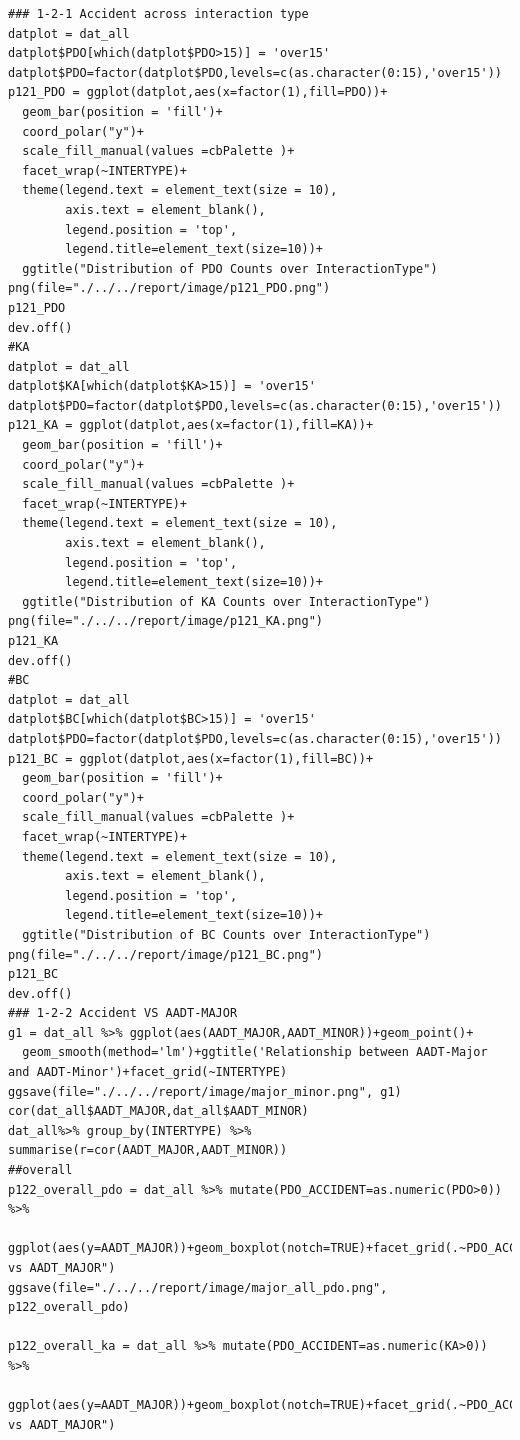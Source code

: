 \documentclass[11pt]{scrartcl} %
\begin{document}
\begin{lstlisting}
### 1-2-1 Accident across interaction type
datplot = dat_all
datplot$PDO[which(datplot$PDO>15)] = 'over15'
datplot$PDO=factor(datplot$PDO,levels=c(as.character(0:15),'over15'))
p121_PDO = ggplot(datplot,aes(x=factor(1),fill=PDO))+
  geom_bar(position = 'fill')+
  coord_polar("y")+
  scale_fill_manual(values =cbPalette )+
  facet_wrap(~INTERTYPE)+
  theme(legend.text = element_text(size = 10),
        axis.text = element_blank(),
        legend.position = 'top',
        legend.title=element_text(size=10))+
  ggtitle("Distribution of PDO Counts over InteractionType")
png(file="./../../report/image/p121_PDO.png")
p121_PDO
dev.off()
#KA
datplot = dat_all
datplot$KA[which(datplot$KA>15)] = 'over15'
datplot$PDO=factor(datplot$PDO,levels=c(as.character(0:15),'over15'))
p121_KA = ggplot(datplot,aes(x=factor(1),fill=KA))+
  geom_bar(position = 'fill')+
  coord_polar("y")+
  scale_fill_manual(values =cbPalette )+
  facet_wrap(~INTERTYPE)+
  theme(legend.text = element_text(size = 10),
        axis.text = element_blank(),
        legend.position = 'top',
        legend.title=element_text(size=10))+
  ggtitle("Distribution of KA Counts over InteractionType")
png(file="./../../report/image/p121_KA.png")
p121_KA
dev.off()
#BC
datplot = dat_all
datplot$BC[which(datplot$BC>15)] = 'over15'
datplot$PDO=factor(datplot$PDO,levels=c(as.character(0:15),'over15'))
p121_BC = ggplot(datplot,aes(x=factor(1),fill=BC))+
  geom_bar(position = 'fill')+
  coord_polar("y")+
  scale_fill_manual(values =cbPalette )+
  facet_wrap(~INTERTYPE)+
  theme(legend.text = element_text(size = 10),
        axis.text = element_blank(),
        legend.position = 'top',
        legend.title=element_text(size=10))+
  ggtitle("Distribution of BC Counts over InteractionType")
png(file="./../../report/image/p121_BC.png")
p121_BC
dev.off()
### 1-2-2 Accident VS AADT-MAJOR
g1 = dat_all %>% ggplot(aes(AADT_MAJOR,AADT_MINOR))+geom_point()+
  geom_smooth(method='lm')+ggtitle('Relationship between AADT-Major and AADT-Minor')+facet_grid(~INTERTYPE)
ggsave(file="./../../report/image/major_minor.png", g1)
cor(dat_all$AADT_MAJOR,dat_all$AADT_MINOR)
dat_all%>% group_by(INTERTYPE) %>% summarise(r=cor(AADT_MAJOR,AADT_MINOR))
##overall
p122_overall_pdo = dat_all %>% mutate(PDO_ACCIDENT=as.numeric(PDO>0)) %>%
  ggplot(aes(y=AADT_MAJOR))+geom_boxplot(notch=TRUE)+facet_grid(.~PDO_ACCIDENT)+ggtitle("PDO vs AADT_MAJOR")
ggsave(file="./../../report/image/major_all_pdo.png", p122_overall_pdo)

p122_overall_ka = dat_all %>% mutate(PDO_ACCIDENT=as.numeric(KA>0)) %>%
  ggplot(aes(y=AADT_MAJOR))+geom_boxplot(notch=TRUE)+facet_grid(.~PDO_ACCIDENT)+ggtitle("KA vs AADT_MAJOR")


\end{lstlisting}
\end{document}

